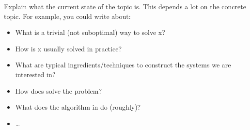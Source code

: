 Explain what the current state of the topic is. This depends a lot on the concrete topic.
For example, you could write about: 
\begin{itemize}
  \item What is a trivial (not suboptimal) way to solve x?
  \item How is x usually solved in practice? 
  \item What are typical ingredients/techniques to construct the systems we are interested in?
  \item How does \cite{testref} solve the problem?
  \item What does the algorithm in \citet{testref} do (roughly)? 
  \item \dots
\end{itemize} 
